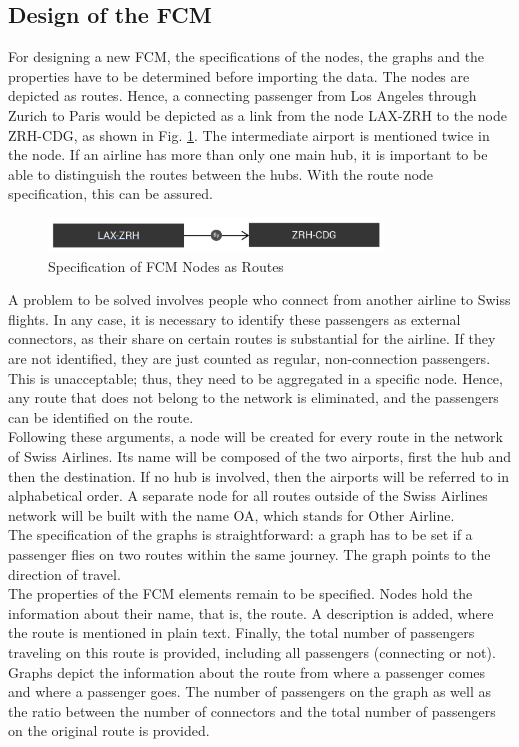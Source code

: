 \documentclass[conference]{IEEEtran}
\begin{document}
\subsection{Design of the FCM}
\label{subsec:design}
For designing a new FCM, the specifications of the nodes, the graphs and the properties have to be determined before importing the data. The nodes are depicted as routes. Hence, a connecting passenger from Los Angeles through Zurich to Paris would be depicted as a link from the node LAX-ZRH to the node ZRH-CDG, as shown in Fig. \ref{fig:noderoute}. The intermediate airport is mentioned twice in the node. If an airline has more than only one main hub, it is important to be able to distinguish the routes between the hubs. With the route node specification, this can be assured.

\begin{figure}[ht]
\includegraphics[width=3.5in]{img/route.png}
\centering
\caption{Specification of FCM Nodes as Routes}
\label{fig:noderoute}
\end{figure}

A problem to be solved involves people who connect from another airline to Swiss flights. In any case, it is necessary to identify these passengers as external connectors, as their share on certain routes is substantial for the airline. If they are not identified, they are just counted as regular, non-connection passengers. This is unacceptable; thus, they need to be aggregated in a specific node. Hence, any route that does not belong to the network is eliminated, and the passengers can be identified on the route.\\
Following these arguments, a node will be created for every route in the network of Swiss Airlines. Its name will be composed of the two airports, first the hub and then the destination. If no hub is involved, then the airports will be referred to in alphabetical order. A separate node for all routes outside of the Swiss Airlines network will be built with the name OA, which stands for Other Airline.\\
The specification of the graphs is straightforward: a graph has to be set if a passenger flies on two routes within the same journey. The graph points to the direction of travel.\\
The properties of the FCM elements remain to be specified. Nodes hold the information about their name, that is, the route. A description is added, where the route is mentioned in plain text. Finally, the total number of passengers traveling on this route is provided, including all passengers (connecting or not). Graphs depict the information about the route from where a passenger comes and where a passenger goes. The number of passengers on the graph as well as the ratio between the number of connectors and the total number of passengers on the original route is provided.\\
\end{document}
